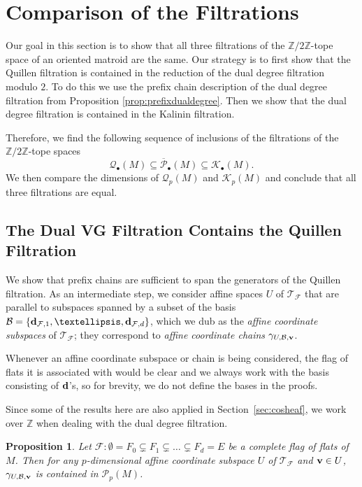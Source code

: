 \documentclass{amsart}
\newtheorem{proposition}[theorem]{Proposition}
\newcommand\Bcal{{\mathcal B}}
\newcommand\Fcal{{\mathcal F}}
\newcommand\Kcal{{\mathcal K}}
\newcommand\Qcal{{\mathcal Q}}
\newcommand\Pcal{{\mathcal P}}
\newcommand\Tcal{{\mathcal T}}
\newcommand\dd{{\bf d}}
\newcommand\vv{{\bf v}}
\newcommand\ZZ{{\mathbb Z}}
\newcommand\Ztwo{{\mathbb Z}/2{\mathbb Z}}
\begin{document}
{\section{Comparison of the Filtrations}

Our goal in this section is to show that all three filtrations of the $\Ztwo$-tope space of an oriented matroid are the same.
Our strategy is to first show that the Quillen filtration is contained in the reduction of the dual degree filtration modulo $2$. 
To do this we use the prefix chain description of the dual degree filtration from Proposition \ref{prop:prefixdualdegree}. 
Then we show that the dual degree filtration is contained in the Kalinin filtration.

Therefore, we find the following sequence of inclusions of the filtrations of the $\Ztwo$-tope spaces
\[\Qcal_{\bullet}(M) \subseteq \overline{\Pcal}_{\bullet}(M) \subseteq \Kcal_{\bullet}(M).\]
We then compare the dimensions of $\Qcal_p(M)$ and $\Kcal_p(M)$ and conclude that all three filtrations are equal. 

\subsection{The Dual VG Filtration Contains the Quillen Filtration}

We show that prefix chains are sufficient to span the generators of the Quillen filtration.
As an intermediate step, we consider affine spaces $U$ of $\Tcal_\Fcal$ that are parallel to subspaces spanned by a subset of the basis $\Bcal=\{\dd_{\Fcal,1},\ldots,\dd_{\Fcal,d}\}$, which we dub as the {\em affine coordinate subspaces} of $\Tcal_\Fcal$; they correspond to {\em affine coordinate chains} $\gamma_{U,\Bcal,\vv}$.

Whenever an affine coordinate subspace or chain is being considered, the flag of flats it is associated with would be clear and we always work with the basis consisting of $\dd$'s, so for brevity, we do not define the bases in the proofs.

Since some of the results here are also applied in Section~\ref{sec:cosheaf}, we work over $\ZZ$ when dealing with the dual degree filtration.

\begin{proposition} \label{prop:prefix_to_coor}
Let $\Fcal:\emptyset=F_0 \subsetneq  F_1 \subsetneq  \ldots \subsetneq  F_d=E$ be a complete flag of flats of $M$.
Then for any $p$-dimensional affine coordinate subspace $U$ of $\Tcal_\Fcal$ and $\vv\in U$, $\gamma_{U,\Bcal,\vv}$ is contained in $\Pcal_p(M)$.
\end{proposition}

}
\end{document}
